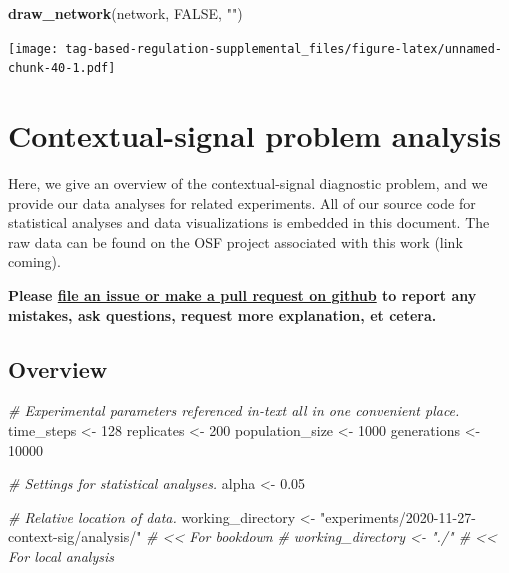 \documentclass[
]{book}
\newenvironment{Shaded}{\begin{snugshade}}{\end{snugshade}}
\newcommand{\CommentTok}[1]{\textcolor[rgb]{0.56,0.35,0.01}{\textit{#1}}}
\newcommand{\DecValTok}[1]{\textcolor[rgb]{0.00,0.00,0.81}{#1}}
\newcommand{\FloatTok}[1]{\textcolor[rgb]{0.00,0.00,0.81}{#1}}
\newcommand{\KeywordTok}[1]{\textcolor[rgb]{0.13,0.29,0.53}{\textbf{#1}}}
\newcommand{\NormalTok}[1]{#1}
\newcommand{\OtherTok}[1]{\textcolor[rgb]{0.56,0.35,0.01}{#1}}
\newcommand{\StringTok}[1]{\textcolor[rgb]{0.31,0.60,0.02}{#1}}
\begin{document}
\begin{Shaded}
\begin{Highlighting}[]
\KeywordTok{draw\_network}\NormalTok{(network, }\OtherTok{FALSE}\NormalTok{, }\StringTok{""}\NormalTok{)}
\end{Highlighting}
\end{Shaded}

\texttt{[image: tag-based-regulation-supplemental\_files/figure-latex/unnamed-chunk-40-1.pdf]}

\hypertarget{contextual-signal-problem-analysis}{%
\chapter{Contextual-signal problem analysis}\label{contextual-signal-problem-analysis}}

Here, we give an overview of the contextual-signal diagnostic problem, and we provide our data analyses for related experiments.
All of our source code for statistical analyses and data visualizations is embedded in this document.
The raw data can be found on the OSF project associated with this work (link coming).

\textbf{Please \href{https://github.com/amlalejini/Tag-based-Genetic-Regulation-for-LinearGP/issues}{file an issue or make a pull request on github} to report any mistakes, ask questions, request more explanation, et cetera.}

\hypertarget{overview-2}{%
\section{Overview}\label{overview-2}}

\begin{Shaded}
\begin{Highlighting}[]
\CommentTok{\# Experimental parameters referenced in{-}text all in one convenient place.}
\NormalTok{time\_steps \textless{}{-}}\StringTok{ }\DecValTok{128}
\NormalTok{replicates \textless{}{-}}\StringTok{ }\DecValTok{200}
\NormalTok{population\_size \textless{}{-}}\StringTok{ }\DecValTok{1000}
\NormalTok{generations \textless{}{-}}\StringTok{ }\DecValTok{10000}

\CommentTok{\# Settings for statistical analyses.}
\NormalTok{alpha \textless{}{-}}\StringTok{ }\FloatTok{0.05}

\CommentTok{\# Relative location of data.}
\NormalTok{working\_directory \textless{}{-}}\StringTok{ "experiments/2020{-}11{-}27{-}context{-}sig/analysis/"} \CommentTok{\# \textless{}\textless{} For bookdown}
\CommentTok{\# working\_directory \textless{}{-} "./"                                         \# \textless{}\textless{} For local analysis}
\end{Highlighting}
\end{Shaded}
\end{document}

